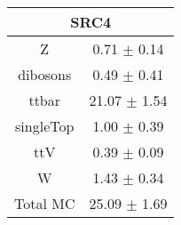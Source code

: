 \begin{tabular}{c|c}
\hline\hline
\multicolumn{2}{c}{\bf SRC4 } \\ \hline 
Z & 0.71 $\pm$ 0.14 \\
dibosons & 0.49 $\pm$ 0.41 \\
ttbar & 21.07 $\pm$ 1.54 \\
singleTop & 1.00 $\pm$ 0.39 \\
ttV & 0.39 $\pm$ 0.09 \\
W & 1.43 $\pm$ 0.34 \\
\hline
Total MC & 25.09 $\pm$ 1.69 \\
\hline\hline
\end{tabular}
